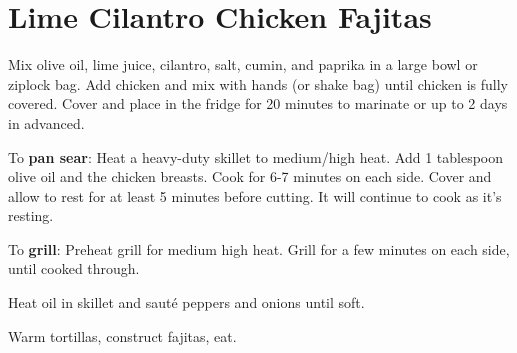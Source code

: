 \section{Lime Cilantro Chicken Fajitas}
\begin{recipe}
	
	
	
	Mix olive oil, lime juice, cilantro, salt, cumin, and paprika in a large bowl or ziplock bag. Add chicken and mix with  hands (or shake bag) until chicken is fully covered. Cover and place in the fridge for 20 minutes to marinate or up to 2 days in advanced.
	
	To \textbf{pan sear}: Heat a heavy-duty skillet to medium/high heat. Add 1 tablespoon olive oil and the chicken breasts. Cook for 6-7 minutes on each side. Cover and allow to rest for at least 5 minutes before cutting. It will continue to cook as it's resting.
	
	To \textbf{grill}: Preheat grill for medium high heat. Grill for a few minutes on each side, until cooked through.
	
	
	Heat oil in skillet and saut\'{e} peppers and onions until soft.
	
	
	
	Warm tortillas, construct fajitas, eat.
	
	
\end{recipe}
